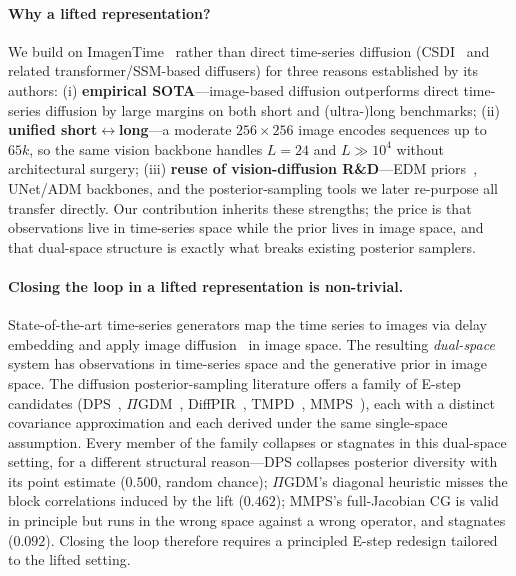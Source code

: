 \documentclass{article}
\theoremstyle{plain}
\theoremstyle{definition}
\theoremstyle{remark}
\begin{document}
\paragraph{Why a lifted representation?}
We build on ImagenTime~\citep{naiman2024imagentime} rather than direct time-series diffusion (CSDI~\citep{tashiro2021csdi} and related transformer/SSM-based diffusers) for three reasons established by its authors: (i) \textbf{empirical SOTA}---image-based diffusion outperforms direct time-series diffusion by large margins on both short and (ultra-)long benchmarks; (ii) \textbf{unified short$\leftrightarrow$long}---a moderate $256\times256$ image encodes sequences up to $65k$, so the same vision backbone handles $L=24$ and $L\gg10^4$ without architectural surgery; (iii) \textbf{reuse of vision-diffusion R\&D}---EDM priors~\citep{karras2022edm}, UNet/ADM backbones, and the posterior-sampling tools we later re-purpose all transfer directly. Our contribution inherits these strengths; the price is that observations live in time-series space while the prior lives in image space, and that dual-space structure is exactly what breaks existing posterior samplers.

\paragraph{Closing the loop in a lifted representation is non-trivial.}
State-of-the-art time-series generators map the time series to images via delay embedding and apply image diffusion~\citep{karras2022edm} in image space. The resulting \emph{dual-space} system has observations in time-series space and the generative prior in image space. The diffusion posterior-sampling literature offers a family of E-step candidates (DPS~\citep{chung2023dps}, $\Pi$GDM~\citep{song2023pigdm}, DiffPIR~\citep{zhu2023diffpir}, TMPD~\citep{boys2023tmpd}, MMPS~\citep{rozet2024diem}), each with a distinct covariance approximation and each derived under the same single-space assumption. Every member of the family collapses or stagnates in this dual-space setting, for a different structural reason---DPS collapses posterior diversity with its point estimate ($0.500$, random chance); $\Pi$GDM's diagonal heuristic misses the block correlations induced by the lift ($0.462$); MMPS's full-Jacobian CG is valid in principle but runs in the wrong space against a wrong operator, and stagnates ($0.092$). Closing the loop therefore requires a principled E-step redesign tailored to the lifted setting.
\end{document}
